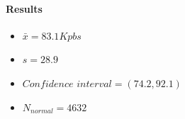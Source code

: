\documentclass[aps,letterpaper,10pt]{revtex4}
\begin{document}
            \paragraph{Results}
                \begin{itemize}
                    \item $\bar{x} = 83.1 Kpbs$
                    \item $s = 28.9$
                    \item $Confidence$ $interval =(74.2 , 92.1) $
                    \item $N_{normal} = 4632$
                \end{itemize}
            \vspace{3mm}           
             \begin{figure}[htp]
                \begin{center}
                \end{center}    
            \end{figure}   
            \vspace{3mm}
\end{document}
